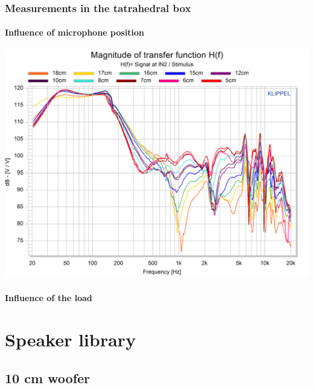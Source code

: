 \documentclass{report}
\begin{document}
\begin{appendices}
\subsection{Measurements in the tatrahedral box}

\subsubsection{Influence of microphone position}
\label{Curves:InfluMicPos}


\begin{center}	
	\includegraphics[scale=0.76,angle=90]{RoomComp/MicPos_TRF} 
	\captionsetup{hypcap=false} 
	\label{fig:micpos_TRF_big}
\end{center}


\subsubsection{Influence of the load}
\label{Curves:InfluLoad}


\chapter{Speaker library}
\label{chap:spk_lib}

\section{10 cm woofer}
\label{spkrlib:10cm}


\end{appendices}
\end{document}
